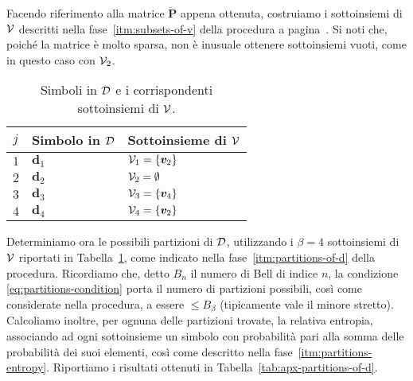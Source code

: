 Facendo riferimento alla matrice \(\bm{\breve{P}}\) appena ottenuta, costruiamo
i sottoinsiemi di \(\mathcal{V}\) descritti nella fase~\ref{itm:subsets-of-v} della
procedura a pagina~\pageref{itm:subsets-of-v}. Si noti che, poiché la matrice è
molto sparsa, non è inusuale ottenere sottoinsiemi vuoti, come in questo caso
con \(\mathcal{V}_2\).
\begin{table}[ht]
    \centering
    \renewcommand{\arraystretch}{1.4}
    \begin{tabular}{lll}
        \toprule
        \(j\) & Simbolo in \(\mathcal{D}\) & Sottoinsieme di \(\mathcal{V}\) \\
        \midrule
        \(1\) & \(\bm{d}_1\) & \(\mathcal{V}_1 = \{ \bm{v}_2 \}\) \\
        \(2\) & \(\bm{d}_2\) & \(\mathcal{V}_2 = \emptyset\)      \\
        \(3\) & \(\bm{d}_3\) & \(\mathcal{V}_3 = \{ \bm{v}_4 \}\) \\
        \(4\) & \(\bm{d}_4\) & \(\mathcal{V}_4 = \{ \bm{v}_2 \}\) \\
        \bottomrule
    \end{tabular}
    \caption{Simboli in $\mathcal{D}$ e i corrispondenti sottoinsiemi di
    $\mathcal{V}$.}
    \label{tab:apx-subsets-of-v}
\end{table}
\newline
Determiniamo ora le possibili partizioni di \(\mathcal{D}\), utilizzando i $\beta =
4$ sottoinsiemi di \(\mathcal{V}\) riportati in Tabella~\ref{tab:apx-subsets-of-v},
come indicato nella fase~\ref{itm:partitions-of-d} della procedura. Ricordiamo
che, detto \(B_n\) il numero di Bell di indice \(n\), la condizione
\eqref{eq:partitions-condition} porta il numero di partizioni possibili, così
come considerate nella procedura, a essere \(\le B_\beta\) (tipicamente vale il
minore stretto). Calcoliamo inoltre, per ognuna delle partizioni trovate, la
relativa entropia, associando ad ogni sottoinsieme un simbolo con probabilità
pari alla somma delle probabilità dei suoi elementi, così come descritto nella
fase~\ref{itm:partitions-entropy}. Riportiamo i risultati ottenuti in
Tabella~\ref{tab:apx-partitions-of-d}.
